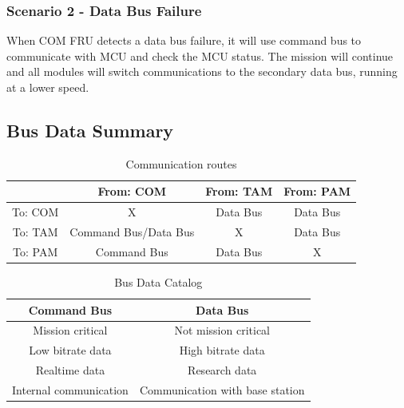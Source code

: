 \documentclass[12pt,article]{memoir}
\begin{document}
\subsubsection{Scenario 2 - Data Bus Failure}
When COM FRU detects a data bus failure, it will use command bus to communicate with MCU and check the MCU status. The mission will continue and all modules will switch communications to the secondary data bus, running at a lower speed. 

\subsection{Bus Data Summary}
\begin{table}[H]
	\centering
		\begin{tabu}{ c | c | c | c }
		& From: COM & From: TAM & From: PAM \\ \hline
		To: COM & X & Data Bus & Data Bus \\ \hline
		To: TAM & Command Bus/Data Bus & X & Data Bus \\ \hline
		To: PAM & Command Bus & Data Bus & X \\ \hline
		\end{tabu}
	\caption{Communication routes}
	\label{tab:routes}
\end{table}
\begin{table}[H]
	\centering
		\begin{tabu}{ c | c }
		Command Bus & Data Bus\\ \hline
		Mission critical & Not mission critical\\
		Low bitrate data & High bitrate data\\
		Realtime data & Research data\\
		Internal communication & Communication with base station\\
		\end{tabu}
	\caption{Bus Data Catalog}
	\label{tab:busdata}
\end{table}

\newpage
\end{document}
